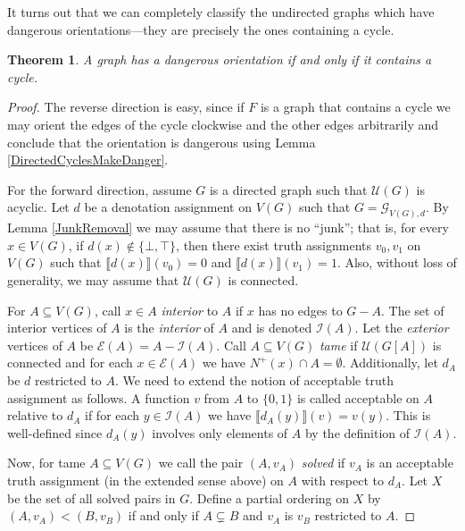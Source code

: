 \documentclass[12pt]{kluwer}
\newtheorem{thm}{Theorem}
\theoremstyle{remark}
\newcommand{\fancy}[1]{\mathcal{#1}}
\def\G{\fancy{G}}
\def\I{\fancy{I}}
\def\U{\fancy{U}}
\def\E{\fancy{E}}
\begin{document}
It turns out that we can completely classify the undirected graphs which have dangerous orientations---they are precisely the ones containing a cycle.

\begin{thm}\label{OrientationDangerous}
A graph has a dangerous orientation if and only if it contains a cycle.
\end{thm}
\begin{proof}
The reverse direction is easy, since if $F$ is a graph that contains a cycle we may orient the edges of the cycle clockwise and the other edges arbitrarily and conclude that the orientation is dangerous using Lemma \ref{DirectedCyclesMakeDanger}.\newline

For the forward direction, assume $G$ is a directed graph such that $\U(G)$ is acyclic. Let $d$ be a denotation assignment on $V(G)$ such that $G = \G_{V(G), d}$.  By Lemma \ref{JunkRemoval} we may assume that there is no ``junk''; that is, for every $x \in V(G)$, if $d(x) \not \in \{\bot, \top\}$, then there exist truth assignments $v_0, v_1$ on $V(G)$ such that $\llbracket d(x)\rrbracket(v_0) = 0$ and  $\llbracket d(x)\rrbracket(v_1) = 1$.   Also, without loss of generality, we may assume that $\U(G)$ is connected.\newline

For $A \subseteq V(G)$, call $x \in A$ \emph{interior} to $A$ if $x$ has no edges to $G - A$.  The set of interior vertices of $A$ is the \emph{interior} of $A$ and is denoted $\I(A)$. Let the \emph{exterior} vertices of $A$ be $\E(A) = A - \I(A)$.  Call $A \subseteq V(G)$ \emph{tame} if $\U(G[A])$ is connected and for each $x \in \E(A)$ we have $N^+(x) \cap A = \emptyset$. Additionally, let $d_A$ be $d$ restricted to $A$.  We need to extend the notion of acceptable truth assignment as follows.  A function $v$ from $A$ to $\{0,1\}$ is called acceptable on $A$ relative to $d_A$ if for each $y \in \I(A)$ we have $\llbracket d_A(y) \rrbracket(v) = v(y)$.  This is well-defined since $d_A(y)$ involves only elements of $A$ by the definition of $\I(A)$.\newline

Now, for tame $A \subseteq V(G)$ we call the pair $(A, v_A)$ \emph{solved} if $v_A$ is an acceptable truth assignment (in the extended sense above) on $A$ with respect to $d_A$.  Let $X$ be the set of all solved pairs in $G$.  Define a partial ordering on $X$ by $(A, v_A) < (B, v_B)$ if and only if $A \subsetneq B$ and $v_A$ is $v_B$ restricted to $A$.\newline


\end{proof}
\end{document}
